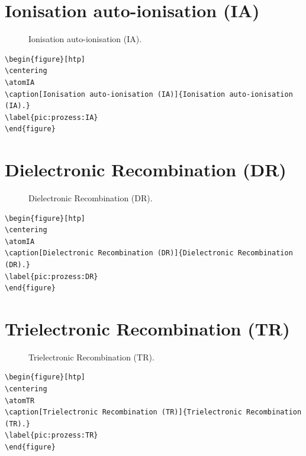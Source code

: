 \documentclass[
	a4paper,
	parskip=half,
    pagesize=auto,      		%
    listof=totoc,   		%
    bibliography=totoc,
	11pt
]{scrartcl}
\begin{document}
\section{Ionisation auto-ionisation (IA)}

\begin{figure}[htp]
\centering
\atomIA
\caption[Ionisation auto-ionisation (IA)]{Ionisation auto-ionisation (IA).}
\label{pic:prozess:IA}
\end{figure}

\begin{lstlisting}
\begin{figure}[htp]
\centering
\atomIA
\caption[Ionisation auto-ionisation (IA)]{Ionisation auto-ionisation (IA).}
\label{pic:prozess:IA}
\end{figure}
\end{lstlisting}

\section{Dielectronic Recombination (DR)}

\begin{figure}[htp]
\centering
\atomDR
\caption[Dielectronic Recombination (DR)]{Dielectronic Recombination (DR).}
\label{pic:prozess:DR}
\end{figure}

\begin{lstlisting}
\begin{figure}[htp]
\centering
\atomIA
\caption[Dielectronic Recombination (DR)]{Dielectronic Recombination (DR).}
\label{pic:prozess:DR}
\end{figure}
\end{lstlisting}

\section{Trielectronic Recombination (TR)}

\begin{figure}[htp]
\centering
\atomTR
\caption[Trielectronic Recombination (TR)]{Trielectronic Recombination (TR).}
\label{pic:prozess:TR}
\end{figure}

\begin{lstlisting}
\begin{figure}[htp]
\centering
\atomTR
\caption[Trielectronic Recombination (TR)]{Trielectronic Recombination (TR).}
\label{pic:prozess:TR}
\end{figure}
\end{lstlisting}
\end{document}

